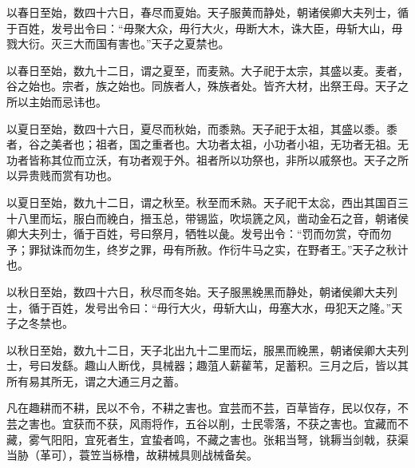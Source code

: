 \documentclass[]{article}
\begin{document}
以春日至始，数四十六日，春尽而夏始。天子服黄而静处，朝诸侯卿大夫列士，循于百姓，发号出令曰：``毋聚大众，毋行大火，毋断大木，诛大臣，毋斩大山，毋戮大衍。灭三大而国有害也。''天子之夏禁也。

以春日至始，数九十二日，谓之夏至，而麦熟。大子祀于太宗，其盛以麦。麦者，谷之始也。宗者，族之始也。同族者人，殊族者处。皆齐大材，出祭王母。天子之所以主始而忌讳也。

以夏日至始，数四十六日，夏尽而秋始，而黍熟。天子祀于太祖，其盛以黍。黍者，谷之美者也；祖者，国之重者也。大功者太祖，小功者小祖，无功者无祖。无功者皆称其位而立沃，有功者观于外。祖者所以功祭也，非所以戚祭也。天子之所以异贵贱而赏有功也。

以夏日至始，数九十二日，谓之秋至。秋至而禾熟。天子祀干太惢，西出其国百三十八里而坛，服白而絻白，搢玉总，带锡监，吹埙篪之风，凿动金石之音，朝诸侯卿大夫列士，循于百姓，号曰祭月，牺牲以彘。发号出令：``罚而勿赏，夺而勿予；罪狱诛而勿生，终岁之罪，毋有所赦。作衍牛马之实，在野者王。''天子之秋计也。

以秋日至始，数四十六日，秋尽而冬始。天子服黑絻黑而静处，朝诸侯卿大夫列士，循于百姓，发号出令曰：``毋行大火，毋斩大山，毋塞大水，毋犯天之隆。''天子之冬禁也。

以秋日至始，数九十二日，天子北出九十二里而坛，服黑而絻黑，朝诸侯卿大夫列士，号曰发繇。趣山人断伐，具械器；趣菹人薪雚苇，足蓄积。三月之后，皆以其所有易其所无，谓之大通三月之蓄。

凡在趣耕而不耕，民以不令，不耕之害也。宜芸而不芸，百草皆存，民以仅存，不芸之害也。宜获而不获，风雨将作，五谷以削，士民零落，不获之害也。宜藏而不藏，雾气阳阳，宜死者生，宜蛰者鸣，不藏之害也。张耜当弩，铫耨当剑戟，获渠当胁（革可），蓑笠当栐橹，故耕械具则战械备矣。
\end{document}
